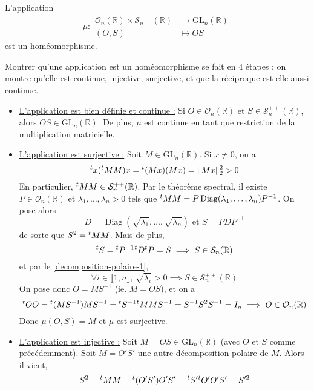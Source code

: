 
	\begin{theorem}
		L'application
		\[ \mu :
		\begin{array}{cl}
			\mathcal{O}_n(\mathbb{R}) \times \mathcal{S}_n^{++}(\mathbb{R}) & \rightarrow \mathrm{GL}_n(\mathbb{R}) \\
			(O, S) & \mapsto OS
		\end{array}
		\]
		est un homéomorphisme.
	\end{theorem}

	\begin{demonstration}
		Montrer qu'une application est un homéomorphisme se fait en $4$ étapes : on montre qu'elle est continue, injective, surjective, et que la réciproque est elle aussi continue.
		\begin{itemize}
			\item \uline{L'application est bien définie et continue :} Si $O \in \mathcal{O}_n(\mathbb{R})$ et $S \in \mathcal{S}_n^{++}(\mathbb{R})$, alors $OS \in \mathrm{GL}_n(\mathbb{R})$. De plus, $\mu$ est continue en tant que restriction de la multiplication matricielle.
			\item \uline{L'application est surjective :} Soit $M \in \mathrm{GL}_n(\mathbb{R})$. Si $x \neq 0$, on a
			\[ \mathstrut ^t x (\mathstrut ^t M M) x = \mathstrut ^t (Mx) (Mx) = \Vert Mx \Vert_2^2 > 0 \]
			En particulier, $\mathstrut ^t M M \in \mathcal{S}_n^{++}(\mathbb{R})$. Par le théorème spectral, il existe $P \in \mathcal{O}_n(\mathbb{R})$ et $\lambda_1, \dots, \lambda_n > 0$ tels que $\mathstrut ^t M M = P \operatorname{Diag}(\lambda_1, \dots, \lambda_n) P^{-1}$. On pose alors
			\[ D = \operatorname{Diag} \left(\sqrt{\lambda_1}, \dots, \sqrt{\lambda_n} \right) \text{ et } S = P D P^{-1} \]
			de sorte que $S^2 = \mathstrut ^t M M$. Mais de plus,
			\[ \mathstrut ^t S = \mathstrut ^t P^{-1} \mathstrut ^t D \mathstrut ^t P = S \implies S \in \mathcal{S}_n(\mathbb{R}) \]
			et par le \cref{decomposition-polaire-1},
			\[ \forall i \in \llbracket 1, n \rrbracket, \, \sqrt{\lambda_i} > 0 \implies S \in \mathcal{S}_n^{++}(\mathbb{R}) \]
			On pose donc $O = MS^{-1}$ (ie. $M = OS$), et on a
			\[ \mathstrut ^t O O = \mathstrut ^t (MS^{-1}) MS^{-1} = \mathstrut ^t S^{-1} \mathstrut ^t M M S^{-1} = S^{-1} S^2 S^{-1} = I_n \implies O \in \mathcal{O}_n(\mathbb{R}) \]
			Donc $\mu(O, S) = M$ et $\mu$ est surjective.
			\item \uline{L'application est injective :} Soit $M = OS \in \mathrm{GL}_n(\mathbb{R})$ (avec $O$ et $S$ comme précédemment). Soit $M = O'S'$ une autre décomposition polaire de $M$. Alors il vient,
			\[ S^2 = \mathstrut ^t M M = \mathstrut ^t (O'S') O'S' = \mathstrut ^t S' \mathstrut ^t O' O' S' = S'^{2} \]

\end{itemize}
\end{demonstration}
